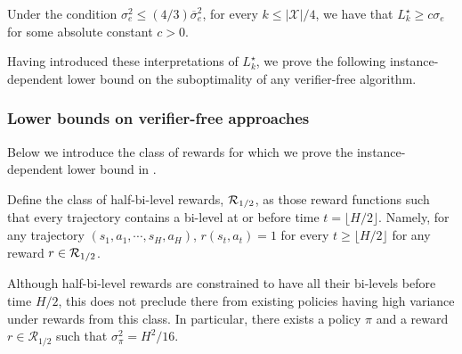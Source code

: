\begin{corollary}
Under the condition $\sigma_e^2 \le (4/3) \overline{\sigma}_e^2$, for every $k \le |\mathcal{X}|/4$, we have that $L_k^\star \ge c \sigma_e$ for some absolute constant $c > 0$.
\end{corollary}

Having introduced these interpretations of $L_k^\star$, we prove the following instance-dependent lower bound on the suboptimality of any verifier-free algorithm.


\subsubsection{Lower bounds on verifier-free approaches} \label{subsubsec:5.4}

Below we introduce the class of rewards for which we prove the instance-dependent lower bound in .

\begin{definition} \label{def:R1/2}
Define the class of half-bi-level rewards, ${\mathcal{R}}_{1/2}$, as those reward functions such that every trajectory contains a bi-level at or before time $t = \lfloor H/2 \rfloor$. Namely, for any trajectory $(s_1,a_1,\cdots,s_H,a_H)$, $r(s_t,a_t) = 1$ for every $t \ge \lfloor H/2 \rfloor$ for any reward $r \in {\mathcal{R}}_{1/2}$.
\end{definition}

\begin{remark}
Although half-bi-level rewards are constrained to have all their bi-levels before time $H/2$, this does not preclude there from existing policies having high variance under rewards from this class. In particular, there exists a policy $\pi$ and a reward $r \in \mathcal{R}_{1/2}$ such that $\sigma_\pi^2 = H^2/16$.
\end{remark}

